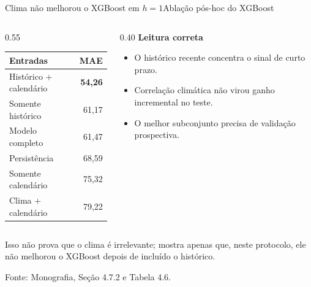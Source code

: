 \documentclass[10pt]{beamer}
\newcommand{\source}[1]{%
  \par\vfill{\raggedleft\tiny\color{gray}Fonte: #1\par}%
}
\begin{document}
\begin{frame}{Clima não melhorou o XGBoost em $h=1$}{Ablação pós-hoc do XGBoost}
  \begin{columns}[T,onlytextwidth]
    \begin{column}{0.55\textwidth}
      \centering
      \begin{tabular}{lr}
        \toprule
        \textbf{Entradas} & \textbf{MAE} \\
        \midrule
        Histórico + calendário & \textbf{54,26} \\
        Somente histórico & 61,17 \\
        Modelo completo & 61,47 \\
        Persistência & 68,59 \\
        Somente calendário & 75,32 \\
        Clima + calendário & 79,22 \\
        \bottomrule
      \end{tabular}
    \end{column}
    \begin{column}{0.40\textwidth}
      \textbf{Leitura correta}
      \begin{itemize}
        \item O histórico recente concentra o sinal de curto prazo.
        \item Correlação climática não virou ganho incremental no teste.
        \item O melhor subconjunto precisa de validação prospectiva.
      \end{itemize}
    \end{column}
  \end{columns}

  \vspace{0.6em}
  \begin{block}{}
    Isso não prova que o clima é irrelevante; mostra apenas que, neste protocolo, ele não melhorou o XGBoost depois de incluído o histórico.
  \end{block}

  \source{Monografia, Seção 4.7.2 e Tabela 4.6.}
\end{frame}
\end{document}
